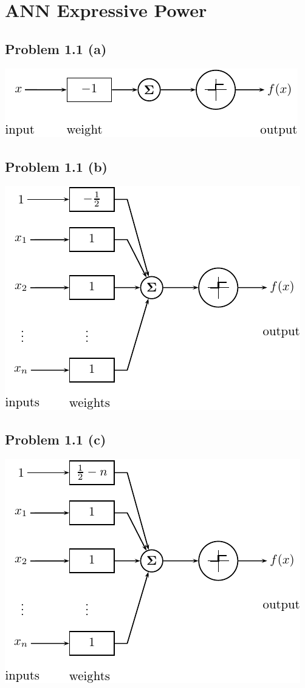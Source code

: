 \section{ANN Expressive Power}
\subsection*{Problem 1.1 (a)}

\begin{center}
\includegraphics[]{figures/1-1-a.pdf}
\end{center}

\subsection*{Problem 1.1 (b)}

\begin{center}
\includegraphics[]{figures/1-1-b.pdf}
\end{center}

\subsection*{Problem 1.1 (c)}

\begin{center}
\includegraphics[]{figures/1-1-c.pdf}
\end{center}